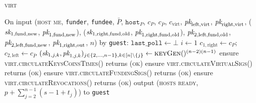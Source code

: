\begin{center}
\begin{processbox}{\textsc{virt}}
\begin{algorithmic}[1]
      \State On input (\textsc{host me}, \texttt{funder}, \texttt{fundee},
      $\bar{P}$, $\texttt{host}_P$, $c_P$, $c_{\bar{P}}$, $c_{\mathrm{virt}}$,
      $\textit{pk}_{\mathrm{left}, \mathrm{virt}}$, $\textit{pk}_{\mathrm{right}, \mathrm{virt}}$,
      ($\textit{sk}_{1, \mathrm{fund}, \mathrm{new}}$, $\textit{pk}_{1, \mathrm{fund},
      \mathrm{new}}$), ($\textit{sk}_{1, \mathrm{right}, \mathrm{fund}, \mathrm{old}}$,
      $\textit{pk}_{1, \mathrm{right}, \mathrm{fund}, \mathrm{old}}$), $\textit{pk}_{2,
      \mathrm{left}, \mathrm{fund}, \mathrm{old}}$, $\textit{pk}_{2, \mathrm{left},
      \mathrm{fund}, \mathrm{new}}$, $\textit{pk}_{1, \mathrm{right}, \mathrm{out}}$,
      $n$) by \texttt{guest}:
      \Indent
        \State $\texttt{last\_poll} \gets \bot$
        \State $i \gets 1$
        \State $c_{1, \mathrm{right}} \gets c_P$; $c_{2, \mathrm{left}} \gets
        c_{\bar{P}}$
        \label{code:virtual-layer:keys:host-me:set-i}
        \State $(\textit{sk}_{1, j, k}, \textit{pk}_{1, j, k})_{j \in \{2, \dots, n-1\}, k \in [n]
        \setminus \{j\}} \gets \textsc{keyGen}()^{(n-2)(n-1)}$
        \State ensure \textsc{virt.circulateKeysCoinsTimes}() returns
        (\textsc{ok})
        \State ensure \textsc{virt.circulateVirtualSigs}() returns (\textsc{ok})
        \State ensure \textsc{virt.circulateFundingSigs}() returns (\textsc{ok})
        \State ensure \textsc{virt.circulateRevocations}() returns (\textsc{ok})
        \State output (\textsc{hosts ready}, $p + \sum\limits_{j = 2}^{n-1}(s -
        1 + t_j)$) to \texttt{guest} 
      \EndIndent
    \end{algorithmic}
  \end{processbox}
  \label{code:virtual-layer:keys}
\end{center} \ \\

